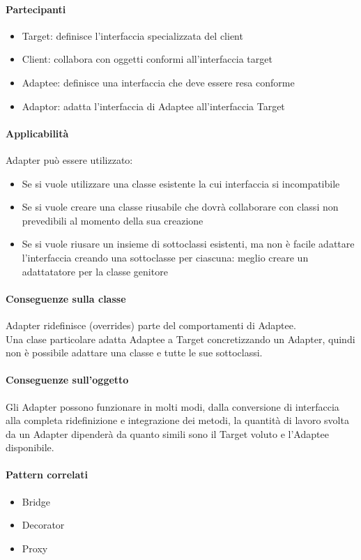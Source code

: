 \paragraph*{Partecipanti}
\begin{itemize}
    \item Target: definisce l'interfaccia specializzata del client
    \item Client: collabora con oggetti conformi all'interfaccia target
    \item Adaptee: definisce una interfaccia che deve essere resa conforme
    \item Adaptor: adatta l'interfaccia di Adaptee all'interfaccia Target
\end{itemize}
\paragraph*{Applicabilità}
Adapter può essere utilizzato:
\begin{itemize}
    \item Se si vuole utilizzare una classe esistente la cui interfaccia si incompatibile
    \item Se si vuole creare una classe riusabile che dovrà collaborare con classi non prevedibili
    al momento della sua creazione
    \item Se si vuole riusare un insieme di sottoclassi esistenti, ma non è facile adattare
    l'interfaccia creando una sottoclasse per ciascuna: meglio creare un adattatatore per la classe genitore
\end{itemize}
\paragraph*{Conseguenze sulla classe}
Adapter ridefinisce (overrides) parte del comportamenti di Adaptee.\\
Una clase particolare adatta Adaptee a Target concretizzando un Adapter, quindi non è possibile
adattare una classe e tutte le sue sottoclassi.
\paragraph*{Conseguenze sull'oggetto}
Gli Adapter possono funzionare in molti modi, dalla conversione di interfaccia alla completa
ridefinizione e integrazione dei metodi, la quantità di lavoro svolta da un Adapter dipenderà
da quanto simili sono il Target voluto e l'Adaptee disponibile.
\paragraph*{Pattern correlati}
\begin{itemize}
    \item Bridge
    \item Decorator
    \item Proxy
\end{itemize}
